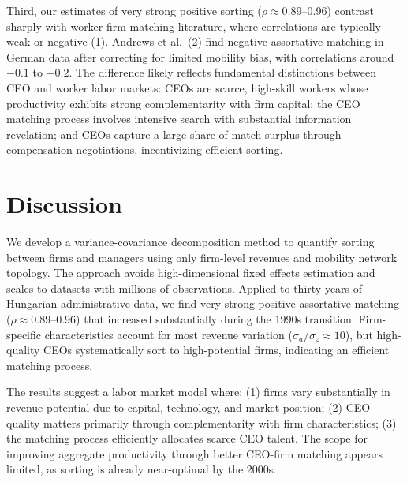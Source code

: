 \documentclass[9pt,twocolumn,twoside]{pnas-new}
\begin{document}
Third, our estimates of very strong positive sorting ($\rho \approx 0.89$--0.96) contrast sharply with worker-firm matching literature, where correlations are typically weak or negative (1). Andrews et al.\ (2) find negative assortative matching in German data after correcting for limited mobility bias, with correlations around $-0.1$ to $-0.2$. The difference likely reflects fundamental distinctions between CEO and worker labor markets: CEOs are scarce, high-skill workers whose productivity exhibits strong complementarity with firm capital; the CEO matching process involves intensive search with substantial information revelation; and CEOs capture a large share of match surplus through compensation negotiations, incentivizing efficient sorting.

\section*{Discussion}

We develop a variance-covariance decomposition method to quantify sorting between firms and managers using only firm-level revenues and mobility network topology. The approach avoids high-dimensional fixed effects estimation and scales to datasets with millions of observations. Applied to thirty years of Hungarian administrative data, we find very strong positive assortative matching ($\rho \approx 0.89$--0.96) that increased substantially during the 1990s transition. Firm-specific characteristics account for most revenue variation ($\sigma_a/\sigma_z \approx 10$), but high-quality CEOs systematically sort to high-potential firms, indicating an efficient matching process.

The results suggest a labor market model where: (1) firms vary substantially in revenue potential due to capital, technology, and market position; (2) CEO quality matters primarily through complementarity with firm characteristics; (3) the matching process efficiently allocates scarce CEO talent. The scope for improving aggregate productivity through better CEO-firm matching appears limited, as sorting is already near-optimal by the 2000s.
\end{document}
